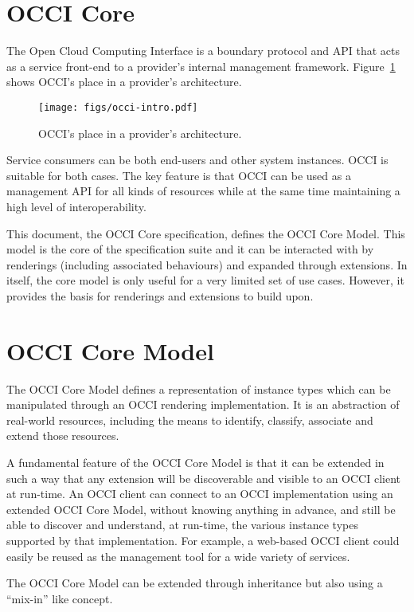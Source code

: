 \documentclass[10pt,a4paper]{article}
\begin{document}
\section{OCCI Core}
The Open Cloud Computing Interface is a boundary protocol and API that
acts as a service front-end to a provider's internal management
framework. Figure~\ref{fig:placement} shows OCCI's place in a
provider's architecture.

\begin{figure}[h]
  \centering
  \texttt{[image: figs/occi-intro.pdf]}
  \caption{OCCI's place in a provider's architecture.}
  \label{fig:placement}
\end{figure}

Service consumers can be both end-users and other system
instances. OCCI is suitable for both cases. The key feature is that
OCCI can be used as a management API for all kinds of resources while
at the same time maintaining a high level of interoperability.

This document, the OCCI Core specification, defines the OCCI Core
Model. This model is the core of the specification suite and it can be
interacted with by renderings (including associated behaviours) and
expanded through extensions. In itself, the core model is only useful
for a very limited set of use cases. However, it provides the basis
for renderings and extensions to build upon.

\section{OCCI Core Model}
The OCCI Core Model defines a representation of instance types which
can be manipulated through an OCCI rendering implementation.  It is an
abstraction of real-world resources, including the means to identify,
classify, associate and extend those resources.

A fundamental feature of the OCCI Core Model is that it can be
extended in such a way that any extension will be discoverable and
visible to an OCCI client at run-time. An OCCI client can connect to
an OCCI implementation using an extended OCCI Core Model, without
knowing anything in advance, and still be able to discover and
understand, at run-time, the various instance types
supported by that implementation.
For example, a
web-based OCCI client could easily be reused as the management tool
for a wide variety of services.

The OCCI Core Model can be extended through inheritance but also
using a ``mix-in'' like concept.
\end{document}
